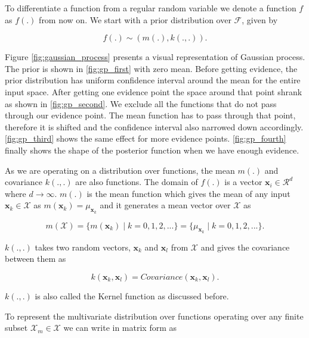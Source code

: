 \documentclass[english]{tktltiki}
\begin{document}
To differentiate a function from a regular random variable we denote a function $f$ as $f(.)$ from now on. We start with a prior distribution over $\mathcal{F}$, given by

\begin{equation}
f(.) \sim (m(.), k(.,.)).
\end{equation}

Figure \ref{fig:gaussian_process} presents a visual representation of Gaussian process. The prior is shown in \ref{fig:gp_first} with zero mean. Before getting evidence, the prior distribution has uniform confidence interval around the mean for the entire input space. After getting one evidence point the space around that point shrank as shown in \ref{fig:gp_second}. We exclude all the functions that do not pass through our evidence point. The mean function has to pass through that point, therefore it is shifted and the confidence interval also narrowed down accordingly. \ref{fig:gp_third} shows the same effect for more evidence points. \ref{fig:gp_fourth} finally shows the shape of the posterior function when we have enough evidence.

As we are operating on a distribution over functions, the mean $m(.)$ and covariance $k(.,.)$ are also functions. The domain of $f(.)$ is a vector $\mathbf{x}_i \in \mathcal{R}^d$ where $d \to \infty$. $m(.)$ is the mean function which gives the mean of any input $\mathbf{x}_k \in \mathcal{X}$ as $m(\mathbf{x}_k) = \mu_{\mathbf{x}_k}$ and it generates a mean vector over $\mathcal{X}$ as

$$
m(\mathcal{X}) = \{m(\mathbf{x}_k) \mid k = 0, 1, 2, ...\} = \{\mu_{\mathbf{x}_k} \mid k = 0, 1, 2, ...\}.
$$

$k(.,.)$ takes two random vectors, $\mathbf{x}_k$ and $\mathbf{x}_l$ from $\mathcal{X}$ and gives the covariance between them as

$$
k(\mathbf{x}_k, \mathbf{x}_l) = Covariance(\mathbf{x}_k, \mathbf{x}_l).
$$

$k(.,.)$ is also called the Kernel function as discussed before.

To represent the multivariate distribution over functions operating over any finite subset $\mathcal{X}_m \in \mathcal{X}$ we can write in matrix form as
\end{document}
